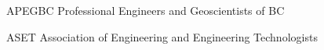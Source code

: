 

\begin{cvskills}

  \cvskill
    {APEGBC} %
    {Professional Engineers and Geoscientists of BC} %

  \cvskill
    {ASET} %
    {Association of Engineering and Engineering Technologists} %

\end{cvskills}
